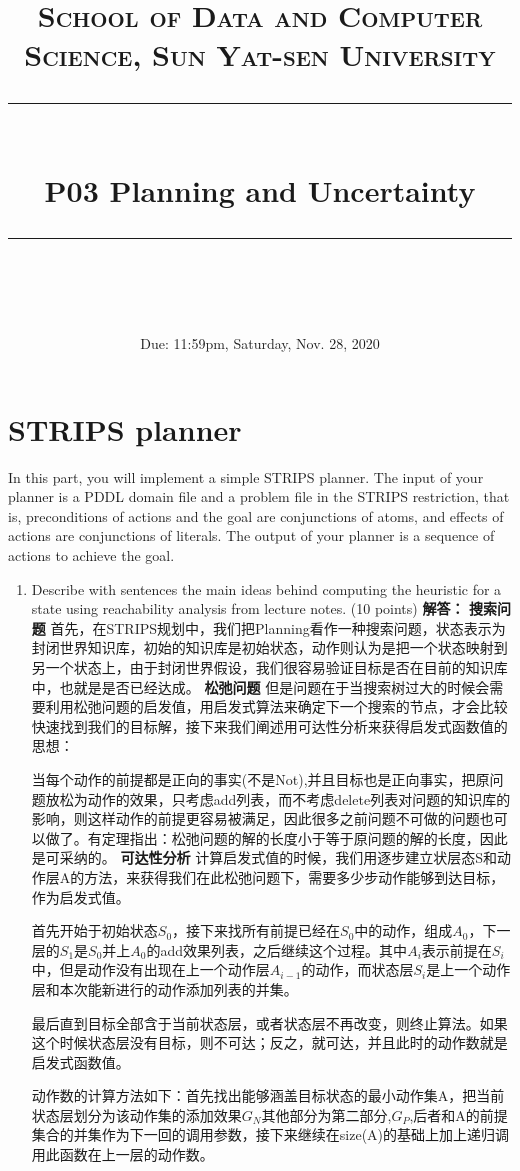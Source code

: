 \documentclass[a4paper, 11pt]{article}
\title{	
\normalfont \normalsize
\textsc{School of Data and Computer Science, Sun Yat-sen University} \\ [25pt] %
\rule{\textwidth}{0.5pt} \\[0.4cm] %
\huge  P03 Planning and Uncertainty\\ %
\rule{\textwidth}{2pt} \\[0.5cm] %
\author{}
\date{Due: 11:59pm, Saturday, Nov. 28, 2020}
}
\begin{document}
\maketitle
\tableofcontents
\newpage
\section{STRIPS planner}
In this part, you will implement a simple STRIPS planner. The input of your planner is a PDDL domain file and a problem file in the STRIPS restriction, that is, preconditions of actions and the goal are conjunctions of atoms, and effects of actions are conjunctions of literals. The output of your planner is a sequence of actions to achieve the goal.

\begin{enumerate}

\item Describe with sentences the main ideas behind computing the heuristic for a state using reachability analysis from lecture notes. (10 points)
\textbf{解答：}
	\textbf{搜索问题}
    首先，在STRIPS规划中，我们把Planning看作一种搜索问题，状态表示为封闭世界知识库，初始的知识库是初始状态，动作则认为是把一个状态映射到另一个状态上，由于封闭世界假设，我们很容易验证目标是否在目前的知识库中，也就是是否已经达成。
    \textbf{松弛问题}
    但是问题在于当搜索树过大的时候会需要利用松弛问题的启发值，用启发式算法来确定下一个搜索的节点，才会比较快速找到我们的目标解，接下来我们阐述用可达性分析来获得启发式函数值的思想：
    
    当每个动作的前提都是正向的事实(不是Not),并且目标也是正向事实，把原问题放松为动作的效果，只考虑add列表，而不考虑delete列表对问题的知识库的影响，则这样动作的前提更容易被满足，因此很多之前问题不可做的问题也可以做了。有定理指出：松弛问题的解的长度小于等于原问题的解的长度，因此是可采纳的。
    \textbf{可达性分析}
    计算启发式值的时候，我们用逐步建立状层态S和动作层A的方法，来获得我们在此松弛问题下，需要多少步动作能够到达目标，作为启发式值。
    
    首先开始于初始状态$S_0$，接下来找所有前提已经在$S_0$中的动作，组成$A_0$，下一层的$S_1$是$S_0$并上$A_0$的add效果列表，之后继续这个过程。其中$A_i$表示前提在$S_i$中，但是动作没有出现在上一个动作层$A_{i-1}$的动作，而状态层$S_i$是上一个动作层和本次能新进行的动作添加列表的并集。
    
    最后直到目标全部含于当前状态层，或者状态层不再改变，则终止算法。如果这个时候状态层没有目标，则不可达；反之，就可达，并且此时的动作数就是启发式函数值。
    
    动作数的计算方法如下：首先找出能够涵盖目标状态的最小动作集A，把当前状态层划分为该动作集的添加效果$G_N$其他部分为第二部分,$G_P$,后者和A的前提集合的并集作为下一回的调用参数，接下来继续在size(A)的基础上加上递归调用此函数在上一层的动作数。
    

\end{enumerate}
\end{document}
